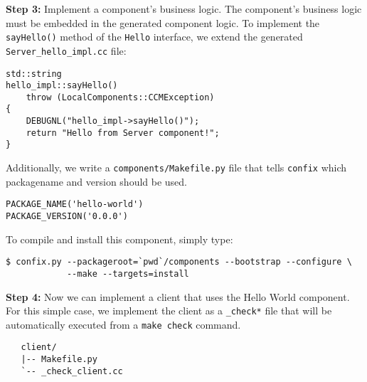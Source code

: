 \noindent
{\bf Step 3:} Implement a component's business logic.
The component's business logic must be embedded in the generated
component logic. 
To implement the {\tt sayHello()} method of the {\tt Hello} interface,
we extend the generated {\tt Server\_hello\_impl.cc} file:
\begin{small}
\begin{verbatim}
std::string
hello_impl::sayHello()
    throw (LocalComponents::CCMException)
{
    DEBUGNL("hello_impl->sayHello()");
    return "Hello from Server component!";
}
\end{verbatim}
\end{small}

\noindent
Additionally, we write a {\tt components/Makefile.py} file that tells
{\tt confix} which packagename and version should be used.
\begin{small}
\begin{verbatim}
PACKAGE_NAME('hello-world')
PACKAGE_VERSION('0.0.0')
\end{verbatim}
\end{small}

\noindent
To compile and install this component, simply type: 
\begin{small}
\begin{verbatim}
$ confix.py --packageroot=`pwd`/components --bootstrap --configure \
            --make --targets=install
\end{verbatim}
\end{small}


\noindent
{\bf Step 4:} Now we can implement a client that uses the Hello World
component. For this simple case, we implement the client as a {\tt \_check*}
file that will be automatically executed from a {\tt make check} command.

\begin{small}
\begin{verbatim}
   client/
   |-- Makefile.py
   `-- _check_client.cc
\end{verbatim}
\end{small}

